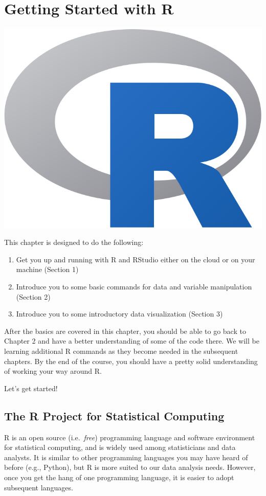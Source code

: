 \documentclass[
]{book}
\begin{document}
\chapter{Getting Started with R}\label{R}

\begin{center}\includegraphics[width=0.4\linewidth]{images/Rlogo} \end{center}

This chapter is designed to do the following:

\begin{enumerate}
\def\labelenumi{\arabic{enumi}.}
\item
  Get you up and running with R and RStudio either on the cloud or on your machine (Section 1)
\item
  Introduce you to some basic commands for data and variable manipulation (Section 2)
\item
  Introduce you to some introductory data visualization (Section 3)
\end{enumerate}

After the basics are covered in this chapter, you should be able to go back to Chapter 2 and have a better understanding of some of the code there. We will be learning additional R commands as they become needed in the subsequent chapters. By the end of the course, you should have a pretty solid understanding of working your way around R.

Let's get started!

\section{The R Project for Statistical Computing}\label{the-r-project-for-statistical-computing}

R is an open source (i.e.~\emph{free}) programming language and software environment for statistical computing, and is widely used among statisticians and data analysts. It is similar to other programming languages you may have heard of before (e.g., Python), but R is more suited to our data analysis needs. However, once you get the hang of one programming language, it is easier to adopt subsequent languages.
\end{document}
